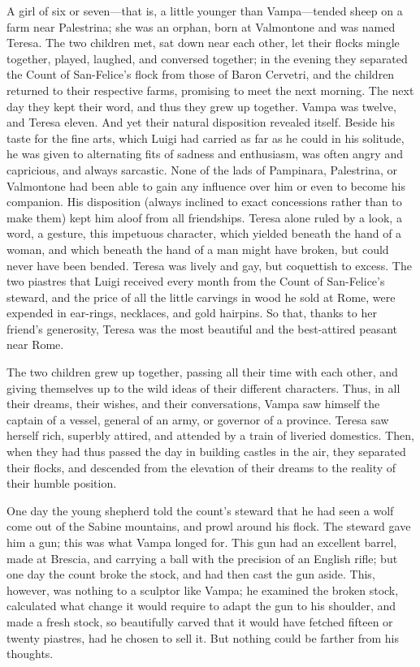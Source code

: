 {A girl of six or seven—that is, a little younger than Vampa—tended sheep on a farm near Palestrina; she was an orphan, born at Valmontone and was named Teresa. The two children met, sat down near each other, let their flocks mingle together, played, laughed, and conversed together; in the evening they separated the Count of San-Felice's flock from those of Baron Cervetri, and the children returned to their respective farms, promising to meet the next morning. The next day they kept their word, and thus they grew up together. Vampa was twelve, and Teresa eleven. And yet their natural disposition revealed itself. Beside his taste for the fine arts, which Luigi had carried as far as he could in his solitude, he was given to alternating fits of sadness and enthusiasm, was often angry and capricious, and always sarcastic. None of the lads of Pampinara, Palestrina, or Valmontone had been able to gain any influence over him or even to become his companion. His disposition (always inclined to exact concessions rather than to make them) kept him aloof from all friendships. Teresa alone ruled by a look, a word, a gesture, this impetuous character, which yielded beneath the hand of a woman, and which beneath the hand of a man might have broken, but could never have been bended. Teresa was lively and gay, but coquettish to excess. The two piastres that Luigi received every month from the Count of San-Felice's steward, and the price of all the little carvings in wood he sold at Rome, were expended in ear-rings, necklaces, and gold hairpins. So that, thanks to her friend's generosity, Teresa was the most beautiful and the best-attired peasant near Rome. 

The two children grew up together, passing all their time with each other, and giving themselves up to the wild ideas of their different characters. Thus, in all their dreams, their wishes, and their conversations, Vampa saw himself the captain of a vessel, general of an army, or governor of a province. Teresa saw herself rich, superbly attired, and attended by a train of liveried domestics. Then, when they had thus passed the day in building castles in the air, they separated their flocks, and descended from the elevation of their dreams to the reality of their humble position. 

One day the young shepherd told the count's steward that he had seen a wolf come out of the Sabine mountains, and prowl around his flock. The steward gave him a gun; this was what Vampa longed for. This gun had an excellent barrel, made at Brescia, and carrying a ball with the precision of an English rifle; but one day the count broke the stock, and had then cast the gun aside. This, however, was nothing to a sculptor like Vampa; he examined the broken stock, calculated what change it would require to adapt the gun to his shoulder, and made a fresh stock, so beautifully carved that it would have fetched fifteen or twenty piastres, had he chosen to sell it. But nothing could be farther from his thoughts. 

}
